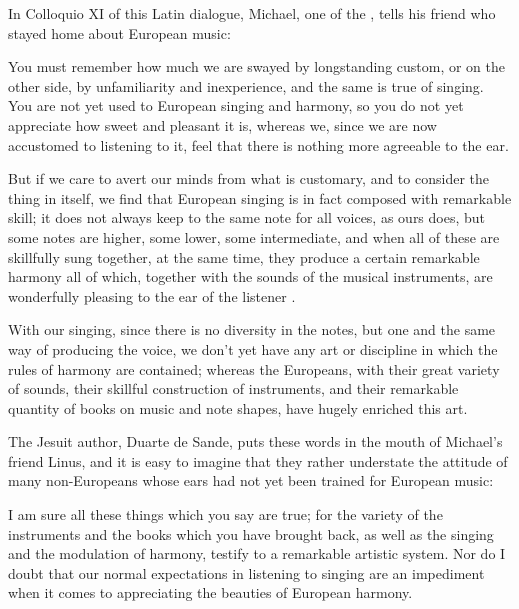 In Colloquio XI of this Latin dialogue, Michael, one of the
, tells his friend who stayed home about European music:
\begin{quoting}
    You must remember \Dots{} how much we are swayed by longstanding custom, or
    on the other side, by unfamiliarity and inexperience, and the same is true
    of singing.
    You are not yet used to European singing and harmony, so you do not yet
    appreciate how sweet and pleasant it is, whereas we, since we are now
    accustomed to listening to it, feel that there is nothing more agreeable to
    the ear.

    But if we care to avert our minds from what is customary, and to consider
    the thing in itself, we find that European singing is in fact composed with
    remarkable skill; it does not always keep to the same note for all voices,
    as ours does, but some notes are higher, some lower, some intermediate, and
    when all of these are skillfully sung together, at the same time, they
    produce a certain remarkable harmony \Dots{} all of which, \Dots{} together
    with the sounds of the musical instruments, are wonderfully pleasing to the
    ear of the listener \Dots{}.

    With our singing, since there is no diversity in the notes, but one and the
    same way of producing the voice, we don't yet have any art or discipline in
    which the rules of harmony are contained; whereas the Europeans, with their
    great variety of sounds, their skillful construction of instruments, and
    their remarkable quantity of books on music and note shapes, have hugely
    enriched this art.%
        \Autocite[155-156]{Massarella:JapaneseTravellers}
\end{quoting}
The Jesuit author, Duarte de Sande, puts these words in the mouth of Michael's
friend Linus, and it is easy to imagine that they rather understate the attitude
of many non-Europeans whose ears had not yet been trained for European music:
\begin{quoting}
    I am sure all these things which you say are true; for the variety of the
    instruments and the books which you have brought back, as well as the
    singing and the modulation of harmony, testify to a remarkable artistic
    system.
    Nor do I doubt that our normal expectations in listening to singing are an
    impediment when it comes to appreciating the beauties of European harmony.%
        \Autocite[156]{Massarella:JapaneseTravellers}
\end{quoting}


